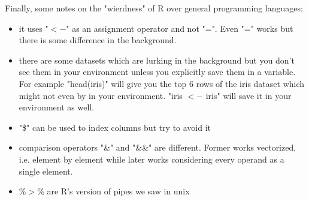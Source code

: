 Finally, some notes on the "wierdness" of R over general programming languages:

\begin{itemize}
    \item it uses "$<-$" as an assignment operator and not "=". Even "=" works but there is some difference in the background.
    \item there are some datasets which are lurking in the background but you don't see them in your environment unless you explicitly save them in a variable. For example "head(iris)" will give you the top 6 rows of the iris dataset which might not even by in your environment. "iris $<-$ iris" will save it in your environment as well.
    \item "\$" can be used to index columns but try to avoid it
    \item comparison operators "\&" and "\&\&" are different. Former works vectorized, i.e. element by element while later works considering every operand as a single element.
    \item \%$>$\% are R's version of pipes we saw in unix
\end{itemize} 
